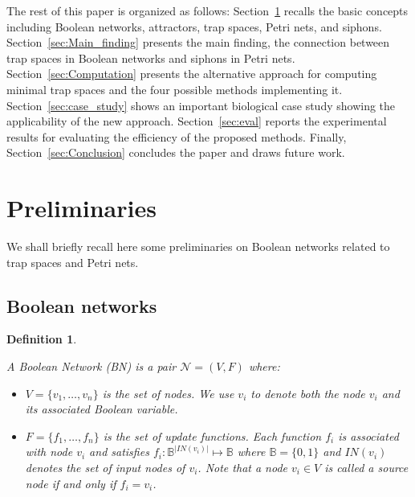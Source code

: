 \documentclass[preprint,12pt]{elsarticle}
\newtheorem{definition}{Definition}[section]
\newcommand{\vangiang}[1]{\textcolor{magenta}{#1}}
\newcommand{\IN}{\mathit{IN}}
\begin{document}
The rest of this paper is organized as follows: Section~\ref{sec:Preliminaries} recalls the basic concepts including Boolean networks, attractors, trap spaces, Petri nets, and siphons.
Section~\ref{sec:Main_finding} presents the main finding, the connection between trap spaces in Boolean networks and siphons in Petri nets.
Section~\ref{sec:Computation} presents the alternative approach for computing minimal trap spaces and the four possible methods implementing it.
Section~\ref{sec:case_study} shows an important biological case study showing the applicability of the new approach.
Section~\ref{sec:eval} reports the experimental results for evaluating the efficiency of the proposed methods.
Finally, Section~\ref{sec:Conclusion} concludes the paper and draws future work.

\section{Preliminaries}%
\label{sec:Preliminaries}

We shall briefly recall here some preliminaries on Boolean networks related to trap spaces and Petri nets.

\subsection{Boolean networks}

\begin{definition}%
\label{def:BN}

  A Boolean Network (BN) is a pair \(\mathcal{N} = (V, F)\) where:
  \begin{itemize}
    \item \(V = \{v_1, \dots, v_n\}\) is the set of nodes.
    We use \(v_i\) to denote both the node \(v_i\) and its associated Boolean variable.

    \item \(F = \{f_1, \dots, f_n\}\) is the set of update functions.
    Each function \(f_i\) is associated with node \(v_i\) and satisfies \(f_i \colon \mathbb{B}^{\vert \IN(v_i)\vert} \mapsto \mathbb{B}\) where \(\mathbb{B} = \{0, 1\}\) and \(\IN(v_i)\) denotes the set of input nodes of \(v_i\).
    Note that a node \(v_i \in V\) is called a \emph{source} node if and only if \(f_{i} = v_i\).
  \end{itemize}

\end{definition}
\end{document}
